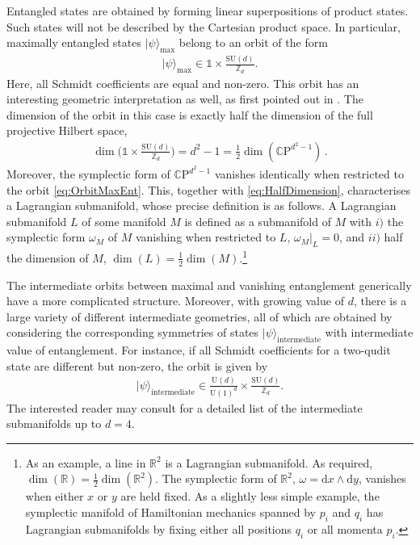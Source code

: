 \documentclass[a4paper,11pt]{article}
\newcommand{\CP}[1]{\mathds{C}\text{P}^{#1}}
\renewcommand{\d}{\text{d}}
\newcommand{\U}{\text{U}}
\newcommand{\SU}{\text{SU}}
\newcommand{\1}{\mathds{1}}
\begin{document}
Entangled states are obtained by forming linear superpositions of product states. Such states will not be described by the Cartesian product space. In particular, maximally entangled states $|\psi\rangle_{\text{max}}$ belong to an orbit of the form
\begin{align}
    |\psi\rangle_{\text{max}}\in\1\times\frac{\SU(d)}{\mathds{Z}_d}.\label{eq:OrbitMaxEnt}
\end{align}
Here, all Schmidt coefficients are equal and non-zero. This orbit  has an interesting geometric interpretation as well, as first pointed out in \cite{Bengtsson2007Curious}. The dimension of the orbit in this case is exactly half the dimension of the full projective Hilbert space,
\begin{align}
    \dim\Big(\1\times\frac{\SU(d)}{\mathds{Z}_d}\Big)=d^2-1=\frac{1}{2}\dim(\CP{d^2-1})\,.\label{eq:HalfDimension}
\end{align}
Moreover, the symplectic form of $\CP{d^2-1}$ vanishes identically when restricted to the orbit \eqref{eq:OrbitMaxEnt}. This, together with \eqref{eq:HalfDimension}, characterises a Lagrangian submanifold, whose precise definition is as follows. A Lagrangian submanifold $L$ of some manifold $M$ is defined as a submanifold of $M$ with $i)$ the symplectic form $\omega_M$ of $M$ vanishing when restricted to $L$, $\omega_M|_L=0$, and $ii)$ half the dimension of $M$, $\dim(L)=\frac{1}{2}\dim(M)$.\footnote{As an example, a line in $\mathds{R}^2$ is a Lagrangian submanifold. As required, $\dim(\mathds{R})=\frac{1}{2}\dim(\mathds{R}^2)$. The symplectic form of $\mathds{R}^2$, $\omega=\d x\wedge\d y$, vanishes when either $x$ or $y$ are held fixed. As a slightly less simple example, the symplectic manifold of Hamiltonian mechanics spanned by $p_i$ and $q_i$ has Lagrangian submanifolds by fixing either all positions $q_i$ or all momenta $p_i$.}

The intermediate orbits between maximal and vanishing entanglement generically have a more complicated structure. Moreover, with growing value of $d$, there is a large variety of different intermediate geometries, all of which are obtained by considering the corresponding symmetries of states $|\psi\rangle_{\text{intermediate}}$ with intermediate value of entanglement. For instance, if all Schmidt coefficients for a two-qudit state are different but non-zero, the orbit is given by
\begin{align}
    |\psi\rangle_{\text{intermediate}}\in\frac{\U(d)}{\U(1)^d}\times\frac{\SU(d)}{\mathds{Z}_d}.\label{eq:OrbitIntermediate}
\end{align}
The interested reader may consult \cite{Sinolecka2002manifolds} for a detailed list of the intermediate submanifolds up to $d=4$.
\end{document}
